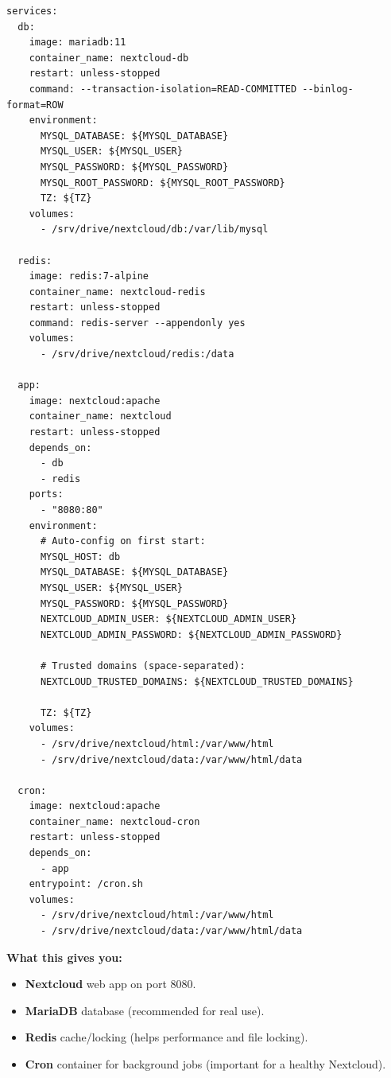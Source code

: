 \begin{lstlisting}
services:
  db:
    image: mariadb:11
    container_name: nextcloud-db
    restart: unless-stopped
    command: --transaction-isolation=READ-COMMITTED --binlog-format=ROW
    environment:
      MYSQL_DATABASE: ${MYSQL_DATABASE}
      MYSQL_USER: ${MYSQL_USER}
      MYSQL_PASSWORD: ${MYSQL_PASSWORD}
      MYSQL_ROOT_PASSWORD: ${MYSQL_ROOT_PASSWORD}
      TZ: ${TZ}
    volumes:
      - /srv/drive/nextcloud/db:/var/lib/mysql

  redis:
    image: redis:7-alpine
    container_name: nextcloud-redis
    restart: unless-stopped
    command: redis-server --appendonly yes
    volumes:
      - /srv/drive/nextcloud/redis:/data

  app:
    image: nextcloud:apache
    container_name: nextcloud
    restart: unless-stopped
    depends_on:
      - db
      - redis
    ports:
      - "8080:80"
    environment:
      # Auto-config on first start:
      MYSQL_HOST: db
      MYSQL_DATABASE: ${MYSQL_DATABASE}
      MYSQL_USER: ${MYSQL_USER}
      MYSQL_PASSWORD: ${MYSQL_PASSWORD}
      NEXTCLOUD_ADMIN_USER: ${NEXTCLOUD_ADMIN_USER}
      NEXTCLOUD_ADMIN_PASSWORD: ${NEXTCLOUD_ADMIN_PASSWORD}

      # Trusted domains (space-separated):
      NEXTCLOUD_TRUSTED_DOMAINS: ${NEXTCLOUD_TRUSTED_DOMAINS}

      TZ: ${TZ}
    volumes:
      - /srv/drive/nextcloud/html:/var/www/html
      - /srv/drive/nextcloud/data:/var/www/html/data

  cron:
    image: nextcloud:apache
    container_name: nextcloud-cron
    restart: unless-stopped
    depends_on:
      - app
    entrypoint: /cron.sh
    volumes:
      - /srv/drive/nextcloud/html:/var/www/html
      - /srv/drive/nextcloud/data:/var/www/html/data
\end{lstlisting}

\textbf{What this gives you:}
\begin{itemize}[leftmargin=*]
  \item \textbf{Nextcloud} web app on port 8080.
  \item \textbf{MariaDB} database (recommended for real use).
  \item \textbf{Redis} cache/locking (helps performance and file locking).
  \item \textbf{Cron} container for background jobs (important for a healthy Nextcloud).
\end{itemize}


